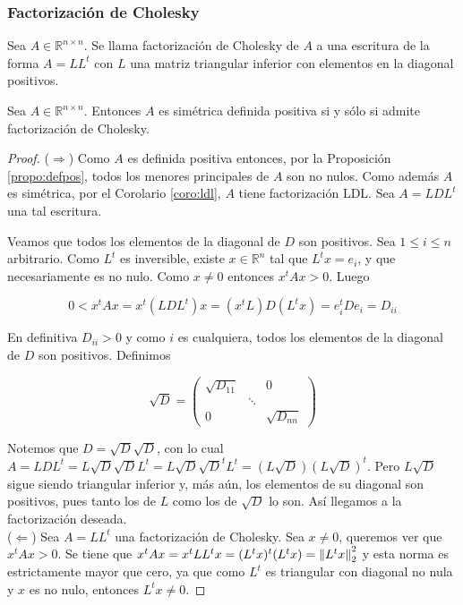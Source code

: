 \subsubsection{Factorización de Cholesky}

\begin{defi}
Sea $A \in \mathbb{R}^{n \times n}$. Se llama factorización de Cholesky de $A$ a una escritura de la forma $A = LL^t$ con $L$ una matriz triangular inferior con elementos en la diagonal positivos.
\end{defi}

\begin{propo}
Sea $A \in \mathbb{R}^{n \times n}$. Entonces $A$ es simétrica definida positiva si y sólo si admite factorización de Cholesky.

\begin{proof}
($\Rightarrow$) Como $A$ es definida positiva entonces, por la Proposición \ref{propo:defpos}, todos los menores principales de $A$ son no nulos. Como además $A$ es simétrica, por el Corolario \ref{coro:ldl}, $A$ tiene factorización LDL. Sea $A = LDL^t$ una tal escritura.

Veamos que todos los elementos de la diagonal de $D$ son positivos. Sea $1 \leq i \leq n$ arbitrario. Como $L^t$ es inversible, existe $x \in \mathbb{R}^n$ tal que $L^tx = e_i$, y que necesariamente es no nulo. Como $x \neq 0$ entonces $x^t A x > 0$. Luego

\[0 < x^t A x = x^t (LDL^t) x = (x^tL) D (L^tx) = e_i^t D e_i = D_{ii}\]

En definitiva $D_{ii} > 0$ y como $i$ es cualquiera, todos los elementos de la diagonal de $D$ son positivos. Definimos

\[\sqrt{D} = \begin{pmatrix}
\sqrt{D_{11}} & & 0\\
 & \ddots & \\
0 & & \sqrt{D_{nn}}
\end{pmatrix}\]

Notemos que $D = \sqrt{D} \sqrt{D}$, con lo cual $A = LDL^t = L\sqrt{D}\sqrt{D}L^t = L\sqrt{D}\sqrt{D}^tL^t = (L \sqrt{D}) (L \sqrt{D})^t$. Pero $L \sqrt{D}$ sigue siendo triangular inferior y, más aún, los elementos de su diagonal son positivos, pues tanto los de $L$ como los de $\sqrt{D}$ lo son. Así llegamos a la factorización deseada.\\[0.25cm]

($\Leftarrow$) Sea $A = LL^t$ una factorización de Cholesky. Sea $x \neq 0$, queremos ver que $x^t A x > 0$. Se tiene que $x^t A x = x^t LL^t x = (L^tx)^t(L^tx) = \left\lVert L^tx\right\rVert_2^2$ y esta norma es estrictamente mayor que cero, ya que como $L^t$ es triangular con diagonal no nula y $x$ es no nulo, entonces $L^tx \neq 0$.

\end{proof}
\end{propo}


